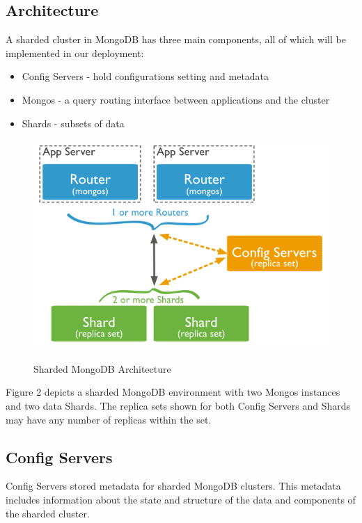 \documentclass[9pt,twocolumn,twoside]{../../styles/osajnl}
\begin{document}
\subsection{Architecture}

A sharded cluster in MongoDB has three main components, all of which will be implemented in our deployment:

\vspace{-\topsep}
\begin{itemize}
\item Config Servers - hold configurations setting and metadata
\item Mongos - a query routing interface between applications and the cluster
\item Shards - subsets of data
\end{itemize}
\vspace{-\topsep}

\begin{figure}[ht]
  \includegraphics[scale=0.5]{images/sharded-cluster-production-architecture.png}
  \caption{Sharded MongoDB Architecture} \cite{www-mongoComponents}
\end{figure}

Figure 2 depicts a sharded MongoDB environment with two Mongos instances and two data Shards.  The replica sets shown for both Config Servers and Shards may have any number of replicas within the set.

\subsection{Config Servers}

Config Servers stored metadata for sharded MongoDB clusters.  This metadata includes information about the state and structure of the data and components of the sharded cluster. \cite{www-mongoConfig}
\end{document}
